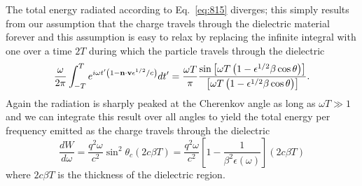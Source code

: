 The total energy radiated according to Eq.~\ref{eq:815} diverges;
this simply results from our assumption that the charge travels
through the dielectric material forever and this assumption is easy to
relax by replacing the infinite integral with one over a time $2T$
during which the particle travels through the dielectric
\begin{equation}
\frac{\omega}{2\pi} \int_{-T}^T e^{i  \omega t' \left ( 1 - {\bf n}
    \cdot {\bf v} \epsilon^{1/2} / c \right )} dt' =
\frac{\omega T}{\pi} \frac{\sin \left [ \omega T \left ( 1 -
      \epsilon^{1/2} \beta \cos \theta \right ) \right ]}{\left [ \omega T \left ( 1 -
      \epsilon^{1/2} \beta \cos \theta \right ) \right ]}.
\end{equation}
Again the radiation is sharply peaked at the Cherenkov angle as long
as $\omega T \gg 1$ and we can integrate this result over all angles
to yield the total energy per frequency emitted as the charge travels
through the dielectric 
\begin{equation}
\frac{d W}{d\omega} = \frac{q^2 \omega}{c^2} \sin^2 \theta_c \left (2
  c \beta T \right ) = \frac{q^2 \omega}{c^2} \left [ 1 -
  \frac{1}{\beta^2 \epsilon(\omega)} \right ] \left ( 2 c \beta T
\right )
\end{equation}
where $2 c \beta T$ is the thickness of the dielectric region.


